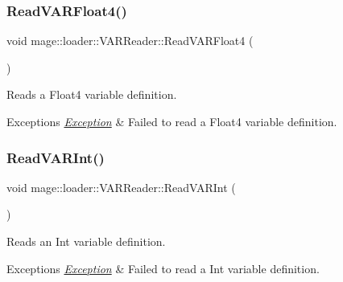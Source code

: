 \subsubsection{\texorpdfstring{Read\+V\+A\+R\+Float4()}{ReadVARFloat4()}}
{\footnotesize\ttfamily void mage\+::loader\+::\+V\+A\+R\+Reader\+::\+Read\+V\+A\+R\+Float4 (\begin{DoxyParamCaption}{ }\end{DoxyParamCaption})\hspace{0.3cm}{\ttfamily [private]}}

Reads a Float4 variable definition.


\begin{DoxyExceptions}{Exceptions}
{\em \hyperlink{classmage_1_1_exception}{Exception}} & Failed to read a Float4 variable definition. \\
\hline
\end{DoxyExceptions}
\hypertarget{classmage_1_1loader_1_1_v_a_r_reader_a88a819066140cacd8ce494fca125e1e2}{}\label{classmage_1_1loader_1_1_v_a_r_reader_a88a819066140cacd8ce494fca125e1e2} 
\subsubsection{\texorpdfstring{Read\+V\+A\+R\+Int()}{ReadVARInt()}}
{\footnotesize\ttfamily void mage\+::loader\+::\+V\+A\+R\+Reader\+::\+Read\+V\+A\+R\+Int (\begin{DoxyParamCaption}{ }\end{DoxyParamCaption})\hspace{0.3cm}{\ttfamily [private]}}

Reads an Int variable definition.


\begin{DoxyExceptions}{Exceptions}
{\em \hyperlink{classmage_1_1_exception}{Exception}} & Failed to read a Int variable definition. \\
\hline
\end{DoxyExceptions}
\hypertarget{classmage_1_1loader_1_1_v_a_r_reader_a4e84ca5a6fabcf2ea29fbf32a5bdf1c4}{}\label{classmage_1_1loader_1_1_v_a_r_reader_a4e84ca5a6fabcf2ea29fbf32a5bdf1c4} 
